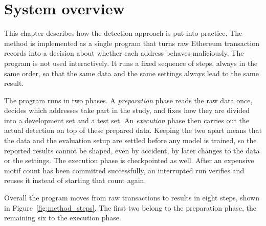 \documentclass{thesisclass}
\begin{document}
\section{System overview}
\label{sec:system_overview}

This chapter describes how the detection approach is put into practice. The
method is implemented as a single program that turns raw Ethereum transaction
records into a decision about whether each address behaves maliciously. The
program is not used interactively. It runs a fixed sequence of steps, always in
the same order, so that the same data and the same settings always lead to the
same result.

The program runs in two phases. A \emph{preparation} phase reads the raw data
once, decides which addresses take part in the study, and fixes how they are
divided into a development set and a test set. An \emph{execution} phase then carries
out the actual detection on top of these prepared data. Keeping the two apart
means that the data and the evaluation setup are settled before any model is
trained, so the reported results cannot be shaped, even by accident, by later
changes to the data or the settings. The execution phase is checkpointed as
well. After an expensive motif count has been committed successfully, an
interrupted run verifies and reuses it instead of starting that count again.

Overall the program moves from raw transactions to results in eight steps, shown
in Figure~\ref{fig:method_steps}. The first two belong to the preparation phase,
the remaining six to the execution phase.
\end{document}
